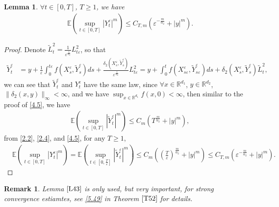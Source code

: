\documentclass[11pt,reqno]{amsart}
\newtheorem{lemma}{\indent Lemma}[section]
\newtheorem{remark}{\indent Remark}[section]
\numberwithin{equation}{section}
\newcommand{\de}{\delta}
\begin{document}
\begin{lemma}\label{L43}
$\forall t\in [0,T]$,  $T\geq1$, we have
\begin{align*}
	& \mathbb{E}\left(\sup_{t\in [0,T]} |Y_{t}^{\varepsilon}|^{m}\right)\leq C_{T,m}\left( \varepsilon^{-\frac{m}{\alpha_{2}}}+|y|^{m}\right).
	\end{align*}
\end{lemma}
\begin{proof}
Denote $\tilde{L}^{2}_{t}=\frac{1}{\varepsilon^{\frac{1}{\alpha_{2}}}}L^{2}_{t\varepsilon}$, so that 
\begin{align*}
\tilde{Y}_{t}^{\varepsilon}&=y+\frac{1}{\varepsilon}\int^{t\varepsilon}_{0}f(X_{s}^{\varepsilon},\tilde{Y}_{s}^{\varepsilon})ds+\frac{\de_{2}(X_{s}^{\varepsilon},\tilde{Y}_{s}^{\varepsilon})}{\varepsilon^{\frac{1}{\alpha_{2}}}}L^{2}_{t\varepsilon}=y+\int ^{t}_{0}f(X_{s\varepsilon}^{\varepsilon},\tilde{Y}_{s\varepsilon}^{\varepsilon})ds+\de_{2}(X_{s}^{\varepsilon},\tilde{Y}_{s}^{\varepsilon})\tilde{L}^{2}_{t},
\end{align*}
we can see that $\tilde{Y}_{t}^{\varepsilon}$ and $Y_{t}^{\varepsilon}$ have the same law, since $\forall x\in \mathbb{R}^{d_{1}}$, $y\in \mathbb{R}^{d_{2}}$, $\|\de_{2}(x,y)\|_{\infty}<\infty$, and we have $\sup_{x\in \mathbb{R}^{d_{1}}}f(x,0)<\infty$, then similar to the proof of \eqref{4.5}, we have
\begin{align*}
& \mathbb{E}\left(\sup_{t\in [0,T]} |\tilde{Y}_{t}^{\varepsilon}|^{m}\right)\leq C_{m}\left( T^{\frac{m}{\alpha_{2}}}+|y|^{m}\right),
\end{align*}
from \eqref{2.2}, \eqref{2.4}, and \eqref{4.5}, for any $T\geq 1$,
\begin{align*}
&\mathbb{E}\left(\sup_{t\in [0,T]} |Y_{t}^{\varepsilon}|^{m}\right)= \mathbb{E}\left(\sup_{t\in [0,\frac{T}{\varepsilon}]} |\tilde{Y}_{t}^{\varepsilon}|^{m}\right)\leq C_{m}\left( \left( \frac{T}{\varepsilon}\right) ^{\frac{m}{\alpha_{2}}}+|y|^{m}\right) \leq C_{T,m}\left( \varepsilon^{-\frac{m}{\alpha_{2}}}+|y|^{m}\right).
\end{align*}
\end{proof}
\begin{remark}
Lemma $\ref{L43}$ is only used, but very important, for strong convergence estiamtes, see \eqref{5.49} in Theorem $\ref{T52}$ for details.
\end{remark}
\end{document}
